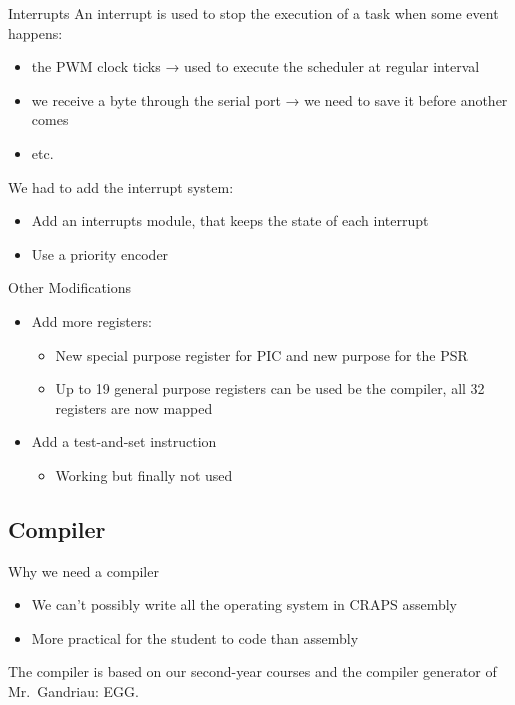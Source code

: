 \documentclass{beamer}
\begin{document}
      \begin{frame}{Interrupts}
        An interrupt is used to stop the execution of a task when some event
        happens:
        \begin{itemize}
          \item the PWM clock ticks → used to execute the scheduler at regular
            interval
          \item we receive a byte through the serial port → we need to save it
            before another comes
          \item etc.
        \end{itemize}

        \pause

        We had to add the interrupt system:
        \begin{itemize}
          \item Add an interrupts module, that keeps the state of each interrupt
          \item Use a priority encoder
        \end{itemize}
      \end{frame}

      \begin{frame}{Other Modifications}
        \begin{itemize}
          \item Add more registers:
            \begin{itemize}
                \item New special purpose register for PIC and new purpose for
                  the PSR
                \item Up to 19 general purpose registers can be used be the
                  compiler, all 32 registers are now mapped
            \end{itemize}
          \pause
          \item Add a test-and-set instruction
            \begin{itemize}
                \item Working but finally not used
            \end{itemize}
        \end{itemize}
      \end{frame}

    \subsection{Compiler}
      \begin{frame}{Why we need a compiler}

        \begin{itemize}
          \item We can't possibly write all the operating system in CRAPS
            assembly
          \item More practical for the student to code than assembly
        \end{itemize}

        The compiler is based on our second-year courses and the compiler
        generator of Mr.\ Gandriau: EGG.
      \end{frame}
\end{document}
